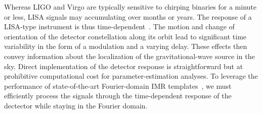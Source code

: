 \documentclass[aps,showpacs,twocolumn,
prd,superscriptaddress,nofootinbib]{revtex4-1}
\newcommand{\jgb}[1]{{\color{DarkGreen} #1}}
\begin{document}

\jgb{Whereas LIGO and Virgo are typically sensitive to chirping binaries for a minute or less, LISA signals may accumulating over months or years.
The response of a LISA-type instrument is thus time-dependent~\cite{Cutler97}.
The motion and change of orientation of the detector constellation along its orbit lead to significant time variability in the form of a modulation and a varying delay. These effects then convey information about the localization of the gravitational-wave source in the sky. Direct implementation of the detector response is straightforward\cite{SynthLISA,LISACode,LISASim} but at prohibitive computational cost for parameter-estimation analyses. To leverage the performance of state-of-the-art Fourier-domain IMR templates~\cite{BTB16,Khan+15}, we must efficiently process the signals through the time-dependent response of the dectector while staying in the Fourier domain.}
\end{document}
